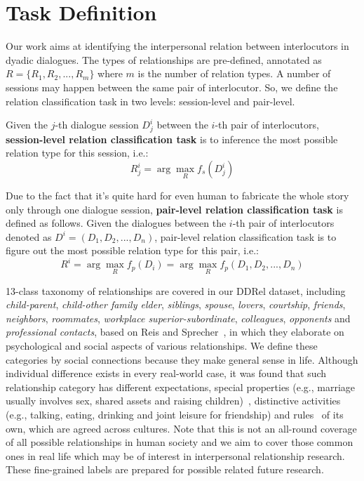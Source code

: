 \section{Task Definition}
\label{sec:task}

Our work aims at identifying the interpersonal relation between interlocutors in dyadic dialogues. 
The types of relationships are pre-defined, annotated as $R=\{R_1, R_2, ..., R_m\}$ where $m$ is the number of relation types.
A number of sessions may happen between the same pair of interlocutor. So, we define the relation classification task in two levels: session-level and pair-level.

Given the $j$-th dialogue session $D_j^i$ between the $i$-th pair of interlocutors,  \textbf{session-level relation classification task} is to inference the most possible relation type for this session, i.e.:
\begin{equation}
R_j^i = \arg\max_{R} f_s(D_j^i)
\end{equation}

Due to the fact that it's quite hard for even human to fabricate the whole story only through one dialogue session, \textbf{pair-level relation classification task} is defined as follows. Given the dialogues between the $i$-th pair of interlocutors denoted as $D^i=(D_1, D_2, ..., D_n)$, pair-level relation classification task is to figure out the most possible relation type for this pair, i.e.:
\begin{equation}
R^i = \arg\max_{R}f_p(D_i) = \arg\max_{R}f_p(D_1, D_2, ..., D_n)
\end{equation}


13-class taxonomy of relationships are covered in our DDRel dataset, 
including {\em child-parent}, {\em child-other family elder}, {\em siblings}, {\em spouse}, {\em lovers}, {\em courtship}, {\em friends}, {\em neighbors}, {\em roommates}, 
{\em workplace superior-subordinate}, {\em colleagues}, {\em opponents} and 
{\em professional contacts},
based on Reis and Sprecher~\cite{reis2009encyclopedia}, 
in which they elaborate on psychological 
and social aspects of various relationships. 
We define these categories by social connections because they make general 
sense in life. Although individual difference exists 
in every real-world case, it was found that such relationship category 
has different expectations, 
special properties (e.g., marriage usually involves sex, 
shared assets and raising children)~\cite{argyle1983sources}, 
distinctive activities (e.g., talking, eating, drinking and 
joint leisure for friendship) and 
rules~\cite{argyle1984rules} of its own, which are agreed across cultures.
Note that this is not an all-round coverage of 
all possible relationships in human society 
and we aim to cover those common
ones in real life which may be of interest in interpersonal 
relationship research.
These fine-grained labels are prepared for possible related future research.


